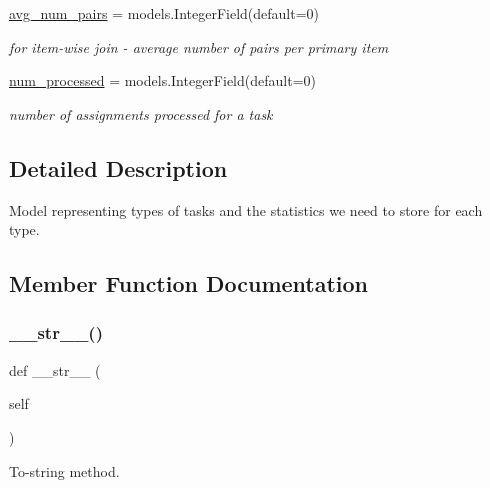 \begin{DoxyCompactItemize}
\mbox{\hyperlink{classjoinapp_1_1models_1_1task__management__models_1_1_task_stats_abb284c412bd3c66808995bf072f99dbd}{avg\+\_\+num\+\_\+pairs}} = models.\+Integer\+Field(default=0)
\begin{DoxyCompactList}\small\item\em for item-\/wise join -\/ average number of pairs per primary item \end{DoxyCompactList}\item 
\mbox{\hyperlink{classjoinapp_1_1models_1_1task__management__models_1_1_task_stats_a1886f706160a9658431d6e804129890a}{num\+\_\+processed}} = models.\+Integer\+Field(default=0)
\begin{DoxyCompactList}\small\item\em number of assignments processed for a task \end{DoxyCompactList}\end{DoxyCompactItemize}


\subsection{Detailed Description}
Model representing types of tasks and the statistics we need to store for each type. 

\subsection{Member Function Documentation}
\mbox{\label{classjoinapp_1_1models_1_1task__management__models_1_1_task_stats_a23e8041ce1015febe4fdace3225714f9}} 
\subsubsection{\texorpdfstring{\_\_str\_\_()}{\_\_str\_\_()}}
{\footnotesize\ttfamily def \+\_\+\+\_\+str\+\_\+\+\_\+ (\begin{DoxyParamCaption}\item[{}]{self }\end{DoxyParamCaption})}



To-\/string method. 

\mbox{\label{classjoinapp_1_1models_1_1task__management__models_1_1_task_stats_a1215690580b8f987fcd20c3ac313fdfd}} 
